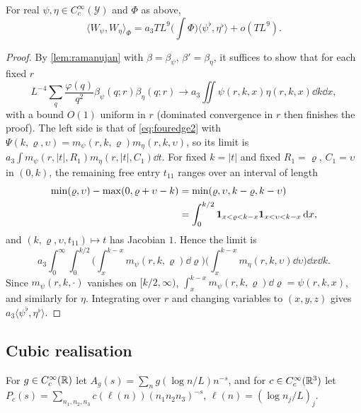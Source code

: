 \documentclass[11pt,colorlinks]{charlie}
\newcommand{\ip}[2]{\langle #1,#2\rangle}
\begin{document}
\begin{proposition}\label{prop:markedgram}
For real $\psi,\eta\in C_c^\infty(\mathcal Y)$ and $\Phi$ as above,
\[
 \ip{W_\psi}{W_\eta}_\Phi=a_3TL^9\Big(\int\Phi\Big)\ip{\psi^\flat}{\eta^\flat}+o(TL^9).
\]
\end{proposition}
\begin{proof}
By \cref{lem:ramanujan} with $\beta=\beta_\psi$, $\beta'=\beta_\eta$, it suffices to show that for each fixed $r$
\[
 L^{-4}\sum_q\frac{\varphi(q)}{q^2}\beta_\psi(q;r)\beta_\eta(q;r)\to a_3\iint\psi(r,k,x)\eta(r,k,x)\dd k\dd x,
\]
with a bound $O(1)$ uniform in $r$ (dominated convergence in $r$ then finishes the proof). The left side is that of \eqref{eq:fouredge2} with $\Psi(k,\varrho,\upsilon)=m_\psi(r,k,\varrho)m_\eta(r,k,\upsilon)$, so its limit is $a_3\int m_\psi(r,|t|,R_1)m_\eta(r,|t|,C_1)\dd t$. For fixed $k=|t|$ and fixed $R_1=\varrho$, $C_1=\upsilon$ in $(0,k)$, the remaining free entry $t_{11}$ ranges over an interval of length
\begin{align*}
 \min(\varrho,\upsilon)-\max(0,\varrho+\upsilon-k)&=\min(\varrho,\upsilon,k-\varrho,k-\upsilon)\\
 &=\int_0^{k/2}\mathbf{1}_{x<\varrho<k-x}\mathbf{1}_{x<\upsilon<k-x}\,\mathrm{d} x,
\end{align*}
and $(k,\varrho,\upsilon,t_{11})\mapsto t$ has Jacobian $1$. Hence the limit is
\[
 a_3\int_0^\infty\!\!\int_0^{k/2}\Big(\int_x^{k-x}m_\psi(r,k,\varrho)\dd\varrho\Big)\Big(\int_x^{k-x}m_\eta(r,k,\upsilon)\dd\upsilon\Big)\dd x\dd k .
\] Since $m_\psi(r,k,\cdot)$ vanishes on $[k/2,\infty)$, $\int_x^{k-x}m_\psi(r,k,\varrho)\dd\varrho=\psi(r,k,x)$, and similarly for $\eta$. Integrating over $r$ and changing variables to $(x,y,z)$ gives $a_3\ip{\psi^\flat}{\eta^\flat}$.
\end{proof}

\subsection{Cubic realisation}
For $g\in C_c^\infty(\mathbb{R})$ let $A_g(s)=\sum_ng(\log n/L)n^{-s}$, and for $c\in C_c^\infty(\mathbb{R}^3)$ let $P_c(s)=\sum_{n_1,n_2,n_3}c(\ell(n))(n_1n_2n_3)^{-s}$, $\ell(n)=(\log n_j/L)_j$.
\end{document}
